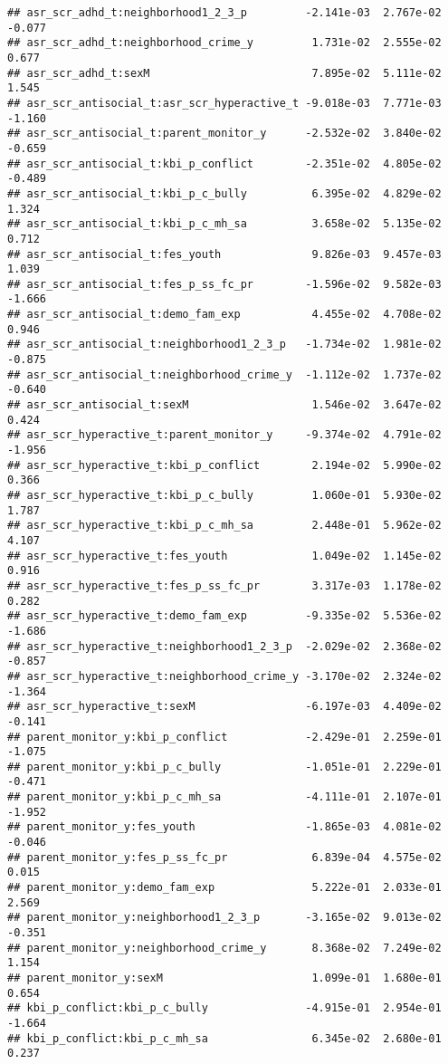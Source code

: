 \documentclass[
]{article}
\begin{document}
\begin{verbatim}
## asr_scr_adhd_t:neighborhood1_2_3_p         -2.141e-03  2.767e-02  -0.077
## asr_scr_adhd_t:neighborhood_crime_y         1.731e-02  2.555e-02   0.677
## asr_scr_adhd_t:sexM                         7.895e-02  5.111e-02   1.545
## asr_scr_antisocial_t:asr_scr_hyperactive_t -9.018e-03  7.771e-03  -1.160
## asr_scr_antisocial_t:parent_monitor_y      -2.532e-02  3.840e-02  -0.659
## asr_scr_antisocial_t:kbi_p_conflict        -2.351e-02  4.805e-02  -0.489
## asr_scr_antisocial_t:kbi_p_c_bully          6.395e-02  4.829e-02   1.324
## asr_scr_antisocial_t:kbi_p_c_mh_sa          3.658e-02  5.135e-02   0.712
## asr_scr_antisocial_t:fes_youth              9.826e-03  9.457e-03   1.039
## asr_scr_antisocial_t:fes_p_ss_fc_pr        -1.596e-02  9.582e-03  -1.666
## asr_scr_antisocial_t:demo_fam_exp           4.455e-02  4.708e-02   0.946
## asr_scr_antisocial_t:neighborhood1_2_3_p   -1.734e-02  1.981e-02  -0.875
## asr_scr_antisocial_t:neighborhood_crime_y  -1.112e-02  1.737e-02  -0.640
## asr_scr_antisocial_t:sexM                   1.546e-02  3.647e-02   0.424
## asr_scr_hyperactive_t:parent_monitor_y     -9.374e-02  4.791e-02  -1.956
## asr_scr_hyperactive_t:kbi_p_conflict        2.194e-02  5.990e-02   0.366
## asr_scr_hyperactive_t:kbi_p_c_bully         1.060e-01  5.930e-02   1.787
## asr_scr_hyperactive_t:kbi_p_c_mh_sa         2.448e-01  5.962e-02   4.107
## asr_scr_hyperactive_t:fes_youth             1.049e-02  1.145e-02   0.916
## asr_scr_hyperactive_t:fes_p_ss_fc_pr        3.317e-03  1.178e-02   0.282
## asr_scr_hyperactive_t:demo_fam_exp         -9.335e-02  5.536e-02  -1.686
## asr_scr_hyperactive_t:neighborhood1_2_3_p  -2.029e-02  2.368e-02  -0.857
## asr_scr_hyperactive_t:neighborhood_crime_y -3.170e-02  2.324e-02  -1.364
## asr_scr_hyperactive_t:sexM                 -6.197e-03  4.409e-02  -0.141
## parent_monitor_y:kbi_p_conflict            -2.429e-01  2.259e-01  -1.075
## parent_monitor_y:kbi_p_c_bully             -1.051e-01  2.229e-01  -0.471
## parent_monitor_y:kbi_p_c_mh_sa             -4.111e-01  2.107e-01  -1.952
## parent_monitor_y:fes_youth                 -1.865e-03  4.081e-02  -0.046
## parent_monitor_y:fes_p_ss_fc_pr             6.839e-04  4.575e-02   0.015
## parent_monitor_y:demo_fam_exp               5.222e-01  2.033e-01   2.569
## parent_monitor_y:neighborhood1_2_3_p       -3.165e-02  9.013e-02  -0.351
## parent_monitor_y:neighborhood_crime_y       8.368e-02  7.249e-02   1.154
## parent_monitor_y:sexM                       1.099e-01  1.680e-01   0.654
## kbi_p_conflict:kbi_p_c_bully               -4.915e-01  2.954e-01  -1.664
## kbi_p_conflict:kbi_p_c_mh_sa                6.345e-02  2.680e-01   0.237

\end{verbatim}
\end{document}

